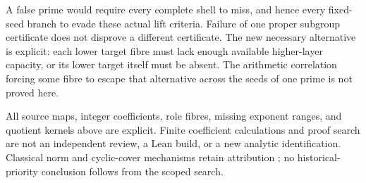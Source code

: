 A false prime would require every complete shell to miss, and hence every
fixed-seed branch to evade these actual lift criteria. Failure of one proper
subgroup certificate does not disprove a different certificate. The new
necessary alternative is explicit: each lower target fibre must lack enough
available higher-layer capacity, or its lower target itself must be absent.
The arithmetic correlation forcing some fibre to escape that alternative
across the seeds of one prime is not proved here.

All source maps, integer coefficients, role fibres, missing exponent ranges,
and quotient kernels above are explicit. Finite coefficient calculations and
proof search are not an independent review, a Lean build, or a new analytic
identification. Classical norm and cyclic-cover mechanisms retain attribution
\cite{GH,SZ}; no historical-priority conclusion follows from the scoped search.

